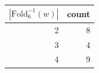 \begin{tabular}{rr}%
\hline%
\textbf{$|\mathrm{Fold}_6^{-1}(w)|$}&\textbf{count}\\%
\hline%
2&8\\%
3&4\\%
4&9\\%
\hline%
\end{tabular}
